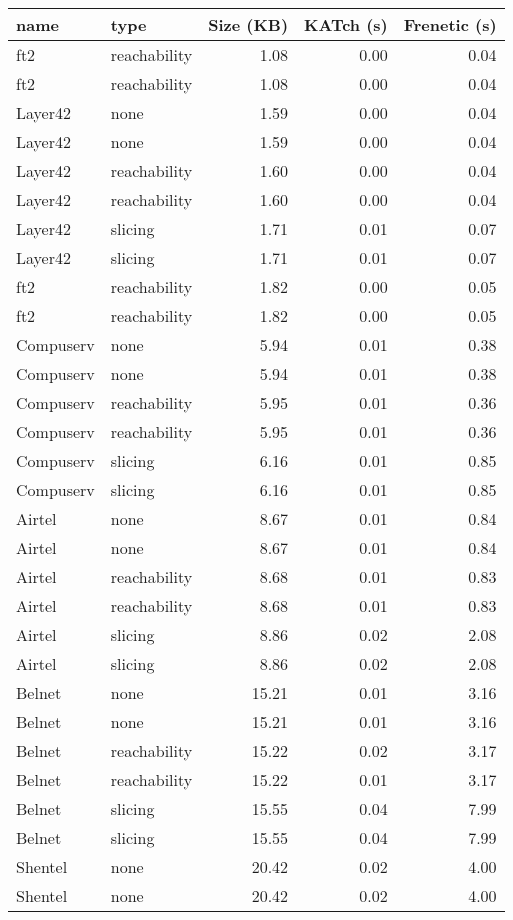 \begin{tabular}{llrrr}
\toprule
name & type & Size (KB) & KATch (s) & Frenetic (s) \\
\midrule
ft2 & reachability & 1.08 & 0.00 & 0.04 \\
ft2 & reachability & 1.08 & 0.00 & 0.04 \\
Layer42 & none & 1.59 & 0.00 & 0.04 \\
Layer42 & none & 1.59 & 0.00 & 0.04 \\
Layer42 & reachability & 1.60 & 0.00 & 0.04 \\
Layer42 & reachability & 1.60 & 0.00 & 0.04 \\
Layer42 & slicing & 1.71 & 0.01 & 0.07 \\
Layer42 & slicing & 1.71 & 0.01 & 0.07 \\
ft2 & reachability & 1.82 & 0.00 & 0.05 \\
ft2 & reachability & 1.82 & 0.00 & 0.05 \\
Compuserv & none & 5.94 & 0.01 & 0.38 \\
Compuserv & none & 5.94 & 0.01 & 0.38 \\
Compuserv & reachability & 5.95 & 0.01 & 0.36 \\
Compuserv & reachability & 5.95 & 0.01 & 0.36 \\
Compuserv & slicing & 6.16 & 0.01 & 0.85 \\
Compuserv & slicing & 6.16 & 0.01 & 0.85 \\
Airtel & none & 8.67 & 0.01 & 0.84 \\
Airtel & none & 8.67 & 0.01 & 0.84 \\
Airtel & reachability & 8.68 & 0.01 & 0.83 \\
Airtel & reachability & 8.68 & 0.01 & 0.83 \\
Airtel & slicing & 8.86 & 0.02 & 2.08 \\
Airtel & slicing & 8.86 & 0.02 & 2.08 \\
Belnet & none & 15.21 & 0.01 & 3.16 \\
Belnet & none & 15.21 & 0.01 & 3.16 \\
Belnet & reachability & 15.22 & 0.02 & 3.17 \\
Belnet & reachability & 15.22 & 0.01 & 3.17 \\
Belnet & slicing & 15.55 & 0.04 & 7.99 \\
Belnet & slicing & 15.55 & 0.04 & 7.99 \\
Shentel & none & 20.42 & 0.02 & 4.00 \\
Shentel & none & 20.42 & 0.02 & 4.00 \\

\end{tabular}
